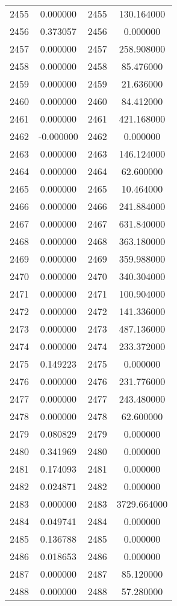 \documentclass[12pt]{article}
\begin{document}
\begin{longtable}{@{}cccc@{}}
2455 & 0.000000 & 2455 & 130.164000 \\
2456 & 0.373057 & 2456 & 0.000000 \\
2457 & 0.000000 & 2457 & 258.908000 \\
2458 & 0.000000 & 2458 & 85.476000 \\
2459 & 0.000000 & 2459 & 21.636000 \\
2460 & 0.000000 & 2460 & 84.412000 \\
2461 & 0.000000 & 2461 & 421.168000 \\
2462 & -0.000000 & 2462 & 0.000000 \\
2463 & 0.000000 & 2463 & 146.124000 \\
2464 & 0.000000 & 2464 & 62.600000 \\
2465 & 0.000000 & 2465 & 10.464000 \\
2466 & 0.000000 & 2466 & 241.884000 \\
2467 & 0.000000 & 2467 & 631.840000 \\
2468 & 0.000000 & 2468 & 363.180000 \\
2469 & 0.000000 & 2469 & 359.988000 \\
2470 & 0.000000 & 2470 & 340.304000 \\
2471 & 0.000000 & 2471 & 100.904000 \\
2472 & 0.000000 & 2472 & 141.336000 \\
2473 & 0.000000 & 2473 & 487.136000 \\
2474 & 0.000000 & 2474 & 233.372000 \\
2475 & 0.149223 & 2475 & 0.000000 \\
2476 & 0.000000 & 2476 & 231.776000 \\
2477 & 0.000000 & 2477 & 243.480000 \\
2478 & 0.000000 & 2478 & 62.600000 \\
2479 & 0.080829 & 2479 & 0.000000 \\
2480 & 0.341969 & 2480 & 0.000000 \\
2481 & 0.174093 & 2481 & 0.000000 \\
2482 & 0.024871 & 2482 & 0.000000 \\
2483 & 0.000000 & 2483 & 3729.664000 \\
2484 & 0.049741 & 2484 & 0.000000 \\
2485 & 0.136788 & 2485 & 0.000000 \\
2486 & 0.018653 & 2486 & 0.000000 \\
2487 & 0.000000 & 2487 & 85.120000 \\
2488 & 0.000000 & 2488 & 57.280000 \\

\end{longtable}
\end{document}
